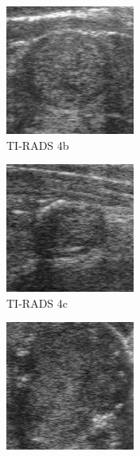 \documentclass[12pt]{article}
\begin{document}
\begin{figure}[h]
\begin{subfigure}[t]{.3\textwidth}
  \centering
  \includegraphics[width=.7\linewidth]{images/t_4b_square.jpg}
  \caption{TI-RADS 4b}
  \label{fig:t4bs}
\end{subfigure}
\hfill
\begin{subfigure}[t]{.3\textwidth}
  \centering
  \includegraphics[width=.7\linewidth]{images/t_4c_square.jpg}
  \caption{TI-RADS 4c}
  \label{fig:t4cs}
\end{subfigure}
\hfill
\begin{subfigure}[t]{.3\textwidth}
  \centering
  \includegraphics[width=.7\linewidth]{images/t_5_square.jpg}

\end{subfigure}
\end{figure}
\end{document}
